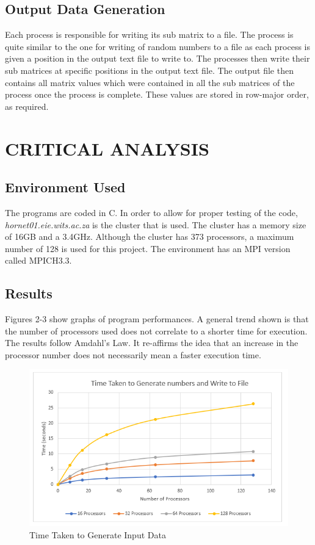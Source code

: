 \documentclass[11pt,conference]{IEEEtran}
\begin{document}
\subsection{Output Data Generation}
\noindent
Each process is responsible for writing its sub matrix to a file. The process is quite similar to the one for writing of random numbers to a file as each process is given a position in the output text file to write to. The processes then write their sub matrices at specific positions in the output text file. The output file then contains all matrix values which were contained in all the sub matrices of the process once the process is complete. These values are stored in row-major order, as required.
\section{CRITICAL ANALYSIS}

\subsection{Environment Used}
\noindent
The programs are coded in C. In order to allow for proper testing of the code, {\sl hornet01.eie.wits.ac.za} is the cluster that is used. The cluster has a memory size of 16GB and a 3.4GHz. Although the cluster has 373 processors, a maximum number of 128 is used for this project. The environment has an MPI version called MPICH3.3.


\subsection{Results}
\noindent
Figures 2-3 show graphs of program performances. A general trend shown is that the number of processors used does not correlate to a shorter time for execution. The results follow Amdahl's Law. It re-affirms the idea that an increase in the processor number does not necessarily mean a faster execution time.

\begin{figure}[h!]
    \centering
    \includegraphics[scale=0.52]{input.PNG}
    \caption{Time Taken to Generate Input Data}
    \label{7}
\end{figure}
\end{document}
